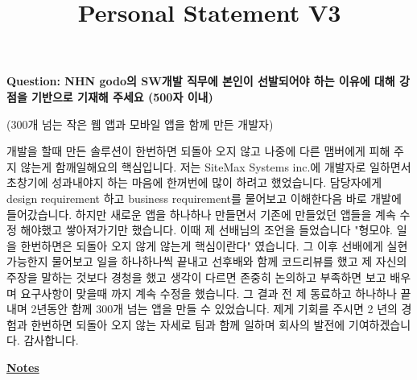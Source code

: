 \documentclass[12pt]{article}
\begin{document}
\title{Personal Statement V3}
\maketitle

\textbf{Question: NHN godo의 SW개발 직무에 본인이 선발되어야 하는 이유에 대해 강점을 기반으로 기재해 주세요 (500자 이내)}

\bigskip

(300개 넘는 작은 웹 앱과 모바일 앱을 함께 만든 개발자)

\bigskip

개발을 할때 만든 솔루션이 한번하면 되돌아 오지 않고 나중에 다른 맴버에게 피해 주지 않는게 함깨일해요의 핵심입니다.
저는 SiteMax Systems inc.에 개발자로 일하면서 초창기에 성과내야지 하는 마음에 한꺼번에 많이 하려고 했었습니다.
담당자에게 design requirement 하고 business requirement를 물어보고 이해한다음 바로 개발에 들어갔습니다.
하지만 새로운 앱을 하나하나 만들면서 기존에 만들었던 앱들을 계속 수정 해야했고 쌓아져가기만 했습니다.
이때 제 선배님의 조언을 들었습니다 "형모야. 일을 한번하면은 되돌아 오지 않게 않는게 핵심이란다" 였습니다.
그 이후 선배에게 실현 가능한지 물어보고 일을 하나하나씩 끝내고 선후배와 함께 코드리뷰를 했고 제 자신의 주장을 말하는 것보다 경청을 했고 생각이 다르면 존중히 논의하고 부족하면 보고 배우며 요구사항이 맞을때 까지 계속 수정을 했습니다.
그 결과 전 제 동료하고 하나하나 끝내며 2년동안 함께 300개 넘는 앱을 만들 수 있었습니다.
제게 기회를 주시면 2 년의 경험과 한번하면 되돌아 오지 않는 자세로 팀과 함께 일하며 회사의 발전에 기여하겠습니다. 감사합니다.

\underline{\textbf{Notes}}
\end{document}
